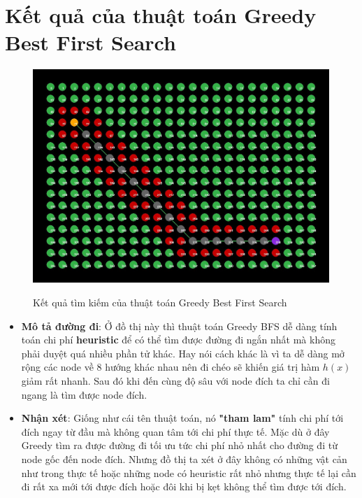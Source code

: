 \section{Kết quả của thuật toán Greedy Best First Search}
\begin{figure}[H]
    \centering
    \includegraphics[scale=0.4]{pic/AStar.jpg}
    \label{fig:my_label}
    \caption{Kết quả tìm kiếm của thuật toán Greedy Best First Search}
\end{figure}
\begin{itemize}
    \item \textbf{Mô tả đường đi}: Ở đồ thị này thì thuật toán Greedy BFS dễ dàng tính toán chi phí \textbf{heuristic} để có thể tìm được đường đi ngắn nhất mà không phải duyệt quá nhiều phần tử khác. Hay nói cách khác là vì ta dễ dàng mở rộng các node về 8 hướng khác nhau nên đi chéo sẽ khiến giá trị hàm $h(x)$ giảm rất nhanh. Sau đó khi đến cùng độ sâu với node đích ta chỉ cần đi ngang là tìm được node đích. 
    \item \textbf{Nhận xét}: Giống như cái tên thuật toán, nó \textbf{"tham lam"} tính chi phí tới đích ngay từ đầu mà không quan tâm tới chi phí thực tế. Mặc dù ở đây Greedy tìm ra được đường đi tối ưu tức chi phí nhỏ nhất cho đường đi từ node gốc đến node đích. Nhưng đồ thị ta xét ở đây không có những vật cản như trong thực tế hoặc những node có heuristic rất nhỏ nhưng thực tế lại cần đi rất xa mới tới được đích hoặc đôi khi bị kẹt không thể tìm được tới đích.  
\end{itemize}
